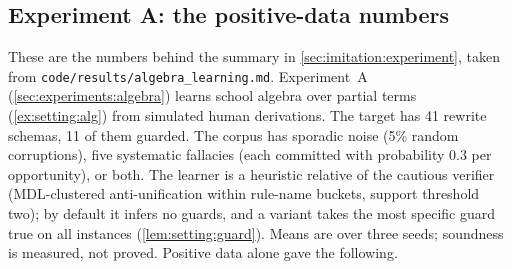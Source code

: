 \subsection{Experiment A: the positive-data numbers}\label{app:imitation:experiment}

 These are the numbers behind the summary in \cref{sec:imitation:experiment}, taken from \texttt{code/\allowbreak results/\allowbreak algebra\_\allowbreak learning.md}. Experiment~A (\cref{sec:experiments:algebra}) learns school algebra over partial terms (\cref{ex:setting:alg}) from simulated human derivations. The target has 41 rewrite schemas, 11 of them guarded. The corpus has sporadic noise (5\% random corruptions), five systematic fallacies (each committed with probability $0.3$ per opportunity), or both. The learner is a heuristic relative of the cautious verifier (MDL-clustered anti-unification within rule-name buckets, support threshold two); by default it infers no guards, and a variant takes the most specific guard true on all instances (\cref{lem:setting:guard}). Means are over three seeds; soundness is measured, not proved. Positive data alone gave the following.
